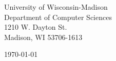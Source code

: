 \begin{minipage}{0.49\textwidth}
\begin{flushleft}
\noindent
University of Wisconsin-Madison\\
Department of Computer Sciences\\
1210 W. Dayton St.\\
Madison, WI 53706-1613
\end{flushleft}
\end{minipage}
\begin{minipage}{0.47\textwidth}
\begin{flushright}
\today
\end{flushright}
\end{minipage} \\

\newcommand{\univ}{University of Wisconsin-Madison}
\newcommand{\univshort}{UW-Madison}
\newcommand{\degree}{Ph.D.}
\newcommand{\dept}{Computer Science}

